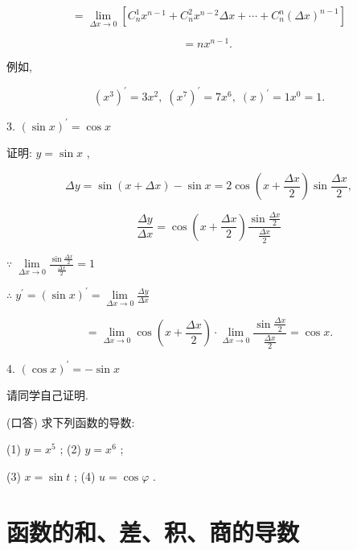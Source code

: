 \documentclass[lang=cn,newtx,12pt,scheme=chinese]{elegantbook}
\begin{document}
\[
= \mathop{\lim }\limits_{{{\Delta x} \rightarrow 0}}\left\lbrack {{C}_{n}^{1}{x}^{n - 1} + {C}_{n}^{2}{x}^{n - 2}{\Delta x} + \cdots + {C}_{n}^{n}{\left( \Delta x\right) }^{n - 1}}\right\rbrack
\]

\[
= n{x}^{n - 1}\text{. }
\]

例如,

\[
{\left( {x}^{3}\right) }^{\prime } = 3{x}^{2},\;{\left( {x}^{7}\right) }^{\prime } = 7{x}^{6},\;{\left( x\right) }^{\prime } = 1{x}^{0} = 1.
\]
\begin{conclusion}
	3. \({\left( \sin x\right) }^{\prime } = \cos x\)
\end{conclusion}

证明: \(y = \sin x\) ,

\[
{\Delta y} = \sin \left( {x + {\Delta x}}\right) - \sin x = 2\cos \left( {x + \frac{\Delta x}{2}}\right) \sin \frac{\Delta x}{2},
\]

\[
\frac{\Delta y}{\Delta x} = \cos \left( {x + \frac{\Delta x}{2}}\right) \frac{\sin \frac{\Delta x}{2}}{\frac{\Delta x}{2}}
\]

\(\because \;\mathop{\lim }\limits_{{{\Delta x} \rightarrow 0}}\frac{\sin \frac{\Delta x}{2}}{\frac{\Delta x}{2}} = 1\)

\(\therefore \;{y}^{\prime } = {\left( \sin x\right) }^{\prime } = \mathop{\lim }\limits_{{{\Delta x} \rightarrow 0}}\frac{\Delta y}{\Delta x}\)

\[
= \mathop{\lim }\limits_{{{\Delta x} \rightarrow 0}}\cos \left( {x + \frac{\Delta x}{2}}\right) \cdot \mathop{\lim }\limits_{{{\Delta x} \rightarrow 0}}\frac{\sin \frac{\Delta x}{2}}{\frac{\Delta x}{2}} = \cos x.
\]

\begin{conclusion}
	4. \({\left( \cos x\right) }^{\prime } = - \sin x\)
\end{conclusion}

请同学自己证明.

\begin{problemset}[练习]

\item (口答) 求下列函数的导数:

(1) \(y = {x}^{5}\) ; (2) \(y = {x}^{6}\) ;

(3) \(x = \sin t\) ; (4) \(u = \cos \varphi\) .

\end{problemset}

\section{函数的和、差、积、商的导数}
\end{document}
